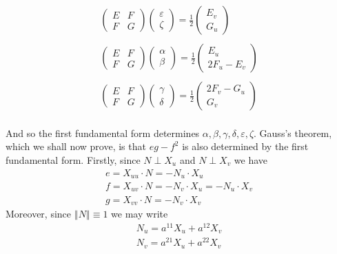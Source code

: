 \documentclass[english]{article}
\def\hlf{\frac{1}{2}}
\newcommand\norm[1]{\left\Vert {#1}\right\Vert }
\def\eps{\varepsilon}
\begin{document}
$$\begin{array}{c}
\left(\begin{array}{cc}
E & F\\
F & G
\end{array}\right)\left(\begin{array}{c}
\eps\\
\zeta
\end{array}\right)=\hlf\left(\begin{array}{c}
E_{v}\\
G_{u}
\end{array}\right)\\\\
\left(\begin{array}{cc}
E & F\\
F & G
\end{array}\right)\left(\begin{array}{c}
\alpha\\
\beta
\end{array}\right)=\hlf\left(\begin{array}{c}
E_{u}\\
2F_{u}-E_{v}
\end{array}\right)\\\\
\left(\begin{array}{cc}
E & F\\
F & G
\end{array}\right)\left(\begin{array}{c}
\gamma\\
\delta
\end{array}\right)=\hlf\left(\begin{array}{c}
2F_{v}-G_{u}\\
G_{v}
\end{array}\right)
\end{array}$$\\
And so the first fundamental form determines $\alpha,\beta,\gamma,\delta,\eps,\zeta$. Gauss's theorem, which we shall now prove, is that $eg-f^2$ is also determined by the first fundamental form. Firstly, since $N\perp X_u$ and $N\perp X_v$ we have 
$$\begin{array}{c}
e=X_{uu}\cdot N=-N_{u}\cdot X_{u}\\
f=X_{uv}\cdot N=-N_{v}\cdot X_{u}=-N_{u}\cdot X_{v}\\
g=X_{vv}\cdot N=-N_{v}\cdot X_{v}
\end{array}$$
Moreover, since $\norm{N}\equiv 1$ we may write 
$$\begin{array}{c}
N_{u}=a^{11}X_{u}+a^{12}X_{v}\\
N_{v}=a^{21}X_{u}+a^{22}X_{v}
\end{array}$$\\
\end{document}
